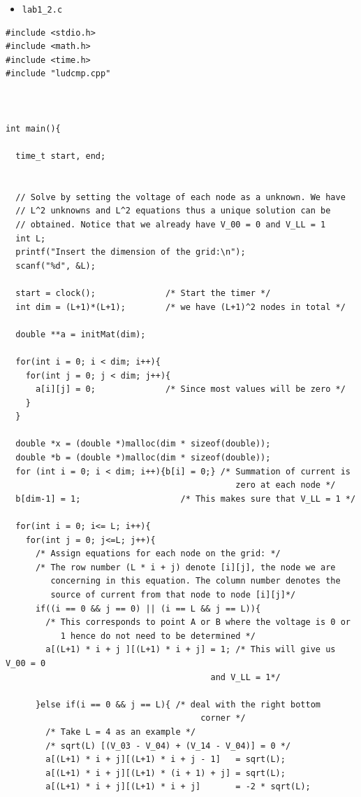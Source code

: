 \documentclass{article}
\begin{document}
\pagebreak
\begin{itemize}
\item \texttt{lab1\_2.c}
\end{itemize}
\hline
\begin{verbatim}
#include <stdio.h>
#include <math.h>
#include <time.h>
#include "ludcmp.cpp"



int main(){

  time_t start, end;


  // Solve by setting the voltage of each node as a unknown. We have
  // L^2 unknowns and L^2 equations thus a unique solution can be
  // obtained. Notice that we already have V_00 = 0 and V_LL = 1
  int L;
  printf("Insert the dimension of the grid:\n");
  scanf("%d", &L);

  start = clock();              /* Start the timer */
  int dim = (L+1)*(L+1);        /* we have (L+1)^2 nodes in total */

  double **a = initMat(dim);

  for(int i = 0; i < dim; i++){
    for(int j = 0; j < dim; j++){
      a[i][j] = 0;              /* Since most values will be zero */
    }
  }

  double *x = (double *)malloc(dim * sizeof(double));
  double *b = (double *)malloc(dim * sizeof(double));
  for (int i = 0; i < dim; i++){b[i] = 0;} /* Summation of current is
                                              zero at each node */
  b[dim-1] = 1;                    /* This makes sure that V_LL = 1 */

  for(int i = 0; i<= L; i++){
    for(int j = 0; j<=L; j++){
      /* Assign equations for each node on the grid: */
      /* The row number (L * i + j) denote [i][j], the node we are
         concerning in this equation. The column number denotes the
         source of current from that node to node [i][j]*/
      if((i == 0 && j == 0) || (i == L && j == L)){
        /* This corresponds to point A or B where the voltage is 0 or
           1 hence do not need to be determined */
        a[(L+1) * i + j ][(L+1) * i + j] = 1; /* This will give us V_00 = 0
                                         and V_LL = 1*/

      }else if(i == 0 && j == L){ /* deal with the right bottom
                                       corner */
        /* Take L = 4 as an example */
        /* sqrt(L) [(V_03 - V_04) + (V_14 - V_04)] = 0 */
        a[(L+1) * i + j][(L+1) * i + j - 1]   = sqrt(L);
        a[(L+1) * i + j][(L+1) * (i + 1) + j] = sqrt(L);
        a[(L+1) * i + j][(L+1) * i + j]       = -2 * sqrt(L);


\end{verbatim}
\end{document}
